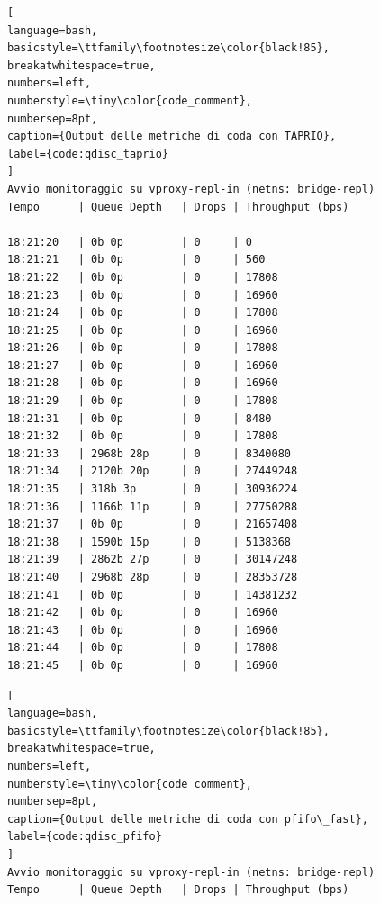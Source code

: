 \documentclass[12pt,a4paper,twoside]{book}
\begin{document}
\begin{onehalfspace}
\begin{lstlisting}[
language=bash,
basicstyle=\ttfamily\footnotesize\color{black!85},
breakatwhitespace=true,
numbers=left,
numberstyle=\tiny\color{code_comment},
numbersep=8pt,
caption={Output delle metriche di coda con TAPRIO},
label={code:qdisc_taprio}
]
Avvio monitoraggio su vproxy-repl-in (netns: bridge-repl)
Tempo      | Queue Depth   | Drops | Throughput (bps)

18:21:20   | 0b 0p         | 0     | 0
18:21:21   | 0b 0p         | 0     | 560
18:21:22   | 0b 0p         | 0     | 17808
18:21:23   | 0b 0p         | 0     | 16960
18:21:24   | 0b 0p         | 0     | 17808
18:21:25   | 0b 0p         | 0     | 16960
18:21:26   | 0b 0p         | 0     | 17808
18:21:27   | 0b 0p         | 0     | 16960
18:21:28   | 0b 0p         | 0     | 16960
18:21:29   | 0b 0p         | 0     | 17808
18:21:31   | 0b 0p         | 0     | 8480
18:21:32   | 0b 0p         | 0     | 17808
18:21:33   | 2968b 28p     | 0     | 8340080
18:21:34   | 2120b 20p     | 0     | 27449248
18:21:35   | 318b 3p       | 0     | 30936224
18:21:36   | 1166b 11p     | 0     | 27750288
18:21:37   | 0b 0p         | 0     | 21657408
18:21:38   | 1590b 15p     | 0     | 5138368
18:21:39   | 2862b 27p     | 0     | 30147248
18:21:40   | 2968b 28p     | 0     | 28353728
18:21:41   | 0b 0p         | 0     | 14381232
18:21:42   | 0b 0p         | 0     | 16960
18:21:43   | 0b 0p         | 0     | 16960
18:21:44   | 0b 0p         | 0     | 17808
18:21:45   | 0b 0p         | 0     | 16960
\end{lstlisting}

\begin{lstlisting}[
language=bash,
basicstyle=\ttfamily\footnotesize\color{black!85},
breakatwhitespace=true,
numbers=left,
numberstyle=\tiny\color{code_comment},
numbersep=8pt,
caption={Output delle metriche di coda con pfifo\_fast},
label={code:qdisc_pfifo}
]
Avvio monitoraggio su vproxy-repl-in (netns: bridge-repl)
Tempo      | Queue Depth   | Drops | Throughput (bps)


\end{lstlisting}
\end{onehalfspace}
\end{document}
